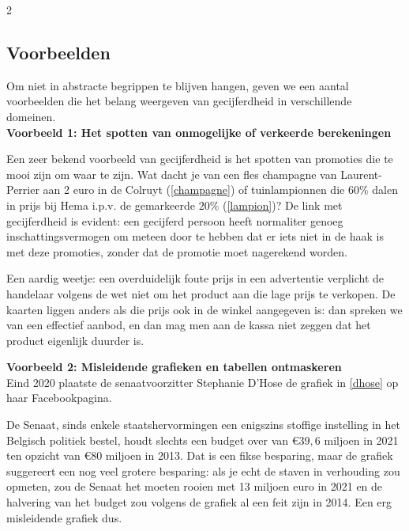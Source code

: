  \begin{multicols}{2}

\subsection{Voorbeelden}
Om niet in abstracte begrippen te blijven hangen, geven we een aantal voorbeelden die het belang weergeven van gecijferdheid in verschillende domeinen.\\


\noindent\textbf{Voorbeeld 1: Het spotten van onmogelijke of verkeerde berekeningen}\\


Een zeer bekend voorbeeld van gecijferdheid is het spotten van promoties die te mooi zijn om waar te zijn. Wat dacht je van een fles champagne van Laurent-Perrier aan 2 euro in de Colruyt (\autoref{champagne}) of tuinlampionnen die 60$\%$ dalen in prijs bij Hema i.p.v. de gemarkeerde $20\%$ (\autoref{lampion})? De link met gecijferdheid is evident: een gecijferd persoon heeft normaliter genoeg inschattingsvermogen om meteen door te hebben dat er iets niet in de haak is met deze promoties, zonder dat de promotie moet nagerekend worden.


Een aardig weetje: een overduidelijk foute prijs in een advertentie verplicht de handelaar volgens de wet niet om het product aan die lage prijs te verkopen. De kaarten liggen anders als die prijs ook in de winkel aangegeven is:   dan spreken we van een effectief aanbod, en dan mag men aan de kassa niet zeggen dat het product eigenlijk duurder is.


\noindent \textbf{Voorbeeld 2: Misleidende grafieken en tabellen ontmaskeren}\\
Eind 2020 plaatste de senaatvoorzitter Stephanie D'Hose de grafiek in \autoref{dhose} op haar Facebookpagina.




De Senaat, sinds enkele staatshervormingen een enigszins stoffige instelling in het Belgisch politiek bestel, houdt slechts een budget over van $\euro39,6$ miljoen in 2021 ten opzicht van $\euro 80$ miljoen in 2013. Dat is een fikse besparing, maar de grafiek suggereert een nog veel grotere besparing: als je echt de staven in verhouding zou opmeten, zou de Senaat het moeten rooien met 13 miljoen euro in 2021 en de halvering van het budget zou volgens de grafiek al een feit zijn in 2014. Een erg misleidende grafiek dus. 


\end{multicols}
